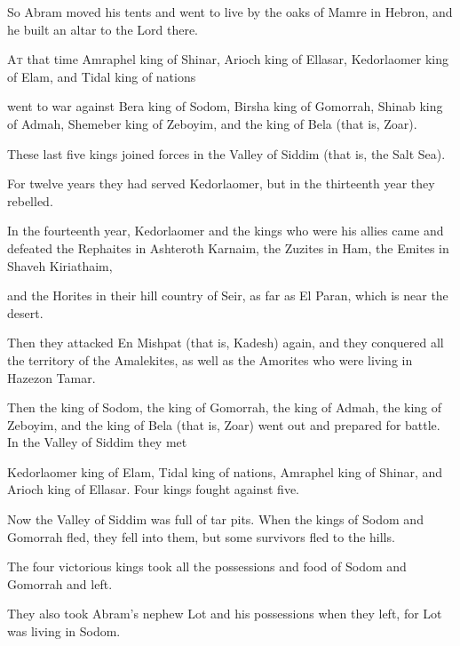 \begin{scripture}
 So Abram moved his tents and went to live by the oaks of Mamre in Hebron, and he built an altar to the Lord there.

 \allowchapbreak\hypertarget{ch-genesis-14}{}\lettrine[lines=5]{\color{pentateuch}A}{\textsc{t}} that time Amraphel king of Shinar, Arioch king of Ellasar, Kedorlaomer king of Elam, and Tidal king of nations\everypar{}
 went to war against Bera king of Sodom, Birsha king of Gomorrah, Shinab king of Admah, Shemeber king of Zeboyim, and the king of Bela (that is, Zoar).
 These last five kings joined forces in the Valley of Siddim (that is, the Salt Sea).
 For twelve years they had served Kedorlaomer, but in the thirteenth year they rebelled.
 In the fourteenth year, Kedorlaomer and the kings who were his allies came and defeated the Rephaites in Ashteroth Karnaim, the Zuzites in Ham, the Emites in Shaveh Kiriathaim,
 and the Horites in their hill country of Seir, as far as El Paran, which is near the desert.
 Then they attacked En Mishpat (that is, Kadesh) again, and they conquered all the territory of the Amalekites, as well as the Amorites who were living in Hazezon Tamar.
\everypar{}

 Then the king of Sodom, the king of Gomorrah, the king of Admah, the king of Zeboyim, and the king of Bela (that is, Zoar) went out and prepared for battle. In the Valley of Siddim they met
 Kedorlaomer king of Elam, Tidal king of nations, Amraphel king of Shinar, and Arioch king of Ellasar. Four kings fought against five.
 Now the Valley of Siddim was full of tar pits. When the kings of Sodom and Gomorrah fled, they fell into them, but some survivors fled to the hills.
 The four victorious kings took all the possessions and food of Sodom and Gomorrah and left.
 They also took Abram's nephew Lot and his possessions when they left, for Lot was living in Sodom.
\everypar{}


\end{scripture}
